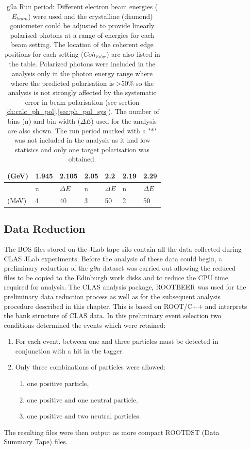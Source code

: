 \begin{table}
\begin{center}
\begin{tabular}{ |l||l|l||l|l||l|l||l|l||}
      \multicolumn{3}{|l||}{(GeV)} & 1.945 & 2.105 & 2.05 & 2.2 & 2.19 & 2.29 \\
      \hline
      \multicolumn{3}{|l||}{} & n  &  $\Delta E$ & n  &  $\Delta E$ & n  &  $\Delta E$ \\
      \multicolumn{3}{|l||}{(MeV)} & 4 & 40 & 3 & 50 & 2 & 50  \\
      \hline
    \end{tabular}
  \end{center}
  \caption{g9a Run period: Different electron beam energies ($E_{beam}$) were used and the crystalline (diamond) goniometer could be adjusted to provide linearly polarised photons at a range of energies for each beam setting. The location of the coherent edge positions for each setting ($Coh_{Edge}$) are also listed in the table. Polarized photons were included in the analysis only in the photon energy range where where the predicted polarisation is >50\% so the analysis is not strongly affected by the systematic error in beam polarisation (see section \ref{ch:calc_ph_pol},\ref{sec:ph_pol_sys}). The number of bins (n)  and bin width ($\Delta E$) used for the analysis are also shown. 
The run period marked with a "*" was not included in the analysis as it had low statisics and only one target polarisation was obtained.} \label{tab:g9a_configs}
\end{table}

\subsection{Data Reduction}
The BOS files stored on the JLab tape silo contain all the data collected during CLAS JLab experiments. Before the analysis of these data could begin, a preliminary reduction of the g9a dataset was carried out allowing the reduced files to be copied to the Edinburgh work disks and to reduce the CPU time required for analysis. The CLAS analysis package, ROOTBEER \cite{rootbeer} was used for the preliminary data reduction process as well as for the subsequent analysis procedure described in this chapter. This is based on ROOT/C++ and interprets the bank structure of CLAS data. In this preliminary event selection two conditions determined the events which were retained:
\begin{enumerate}
\item  For each event, between one and three particles must be detected in conjunction with a hit in the tagger.
\item  Only three combinations of particles were allowed:
  \begin{enumerate}
  \item one positive particle,
  \item one positive and one neutral particle,
  \item one positive and two neutral particles.
  \end{enumerate}
\end{enumerate}
The resulting files were then output as more compact ROOTDST (Data Summary Tape) files.

